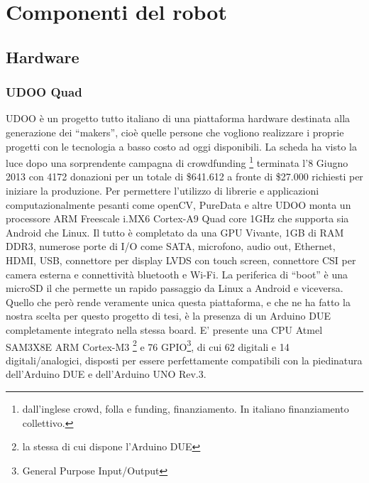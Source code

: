 \chapter{Componenti del robot}
\section{Hardware}
\subsection{UDOO Quad}
UDOO è un progetto tutto italiano di una piattaforma hardware destinata alla 
generazione dei ``makers'', cioè quelle persone che vogliono realizzare i 
proprie progetti con le tecnologia a basso costo ad oggi disponibili. La 
scheda ha visto la luce dopo una sorprendente campagna di crowdfunding
\footnote{dall'inglese crowd, folla e funding, finanziamento. In italiano finanziamento collettivo.} terminata l'8 Giugno 2013 con 4172 donazioni per un totale di \$641.612 a fronte di \$27.000 richiesti per iniziare la produzione. Per permettere l'utilizzo di librerie e applicazioni computazionalmente pesanti 
come openCV, PureData e altre UDOO monta un processore ARM Freescale i.MX6 
Cortex-A9 Quad core 1GHz che supporta sia Android che Linux. Il tutto è 
completato da una GPU Vivante, 1GB di RAM DDR3, numerose porte di I/O come 
SATA, microfono, audio out, Ethernet, HDMI, USB, connettore per display LVDS 
con touch screen, connettore CSI per camera esterna e connettività bluetooth e 
Wi-Fi. La periferica di ``boot'' è una microSD il che permette un rapido 
passaggio da Linux a Android e viceversa. Quello che però rende veramente 
unica questa piattaforma, e che ne ha fatto la nostra scelta per questo 
progetto di tesi, è la presenza di un Arduino DUE completamente integrato 
nella stessa board. 
E' presente una CPU Atmel SAM3X8E ARM Cortex-M3 \footnote{la stessa di cui 
dispone l'Arduino DUE} e 76 GPIO\footnote{General Purpose Input/Output}, di 
cui 62 digitali e 14 digitali/analogici, disposti per essere perfettamente 
compatibili con la piedinatura dell'Arduino DUE e dell'Arduino UNO Rev.3.

